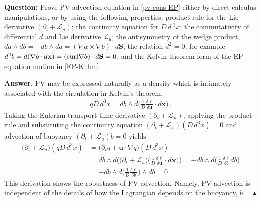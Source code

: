 \documentclass[11pt, oneside]{article}   	%
\numberwithin{equation}{section}
\theoremstyle{plain}
\theoremstyle{definition}
\theoremstyle{remark}
\newcommand{\<}{\langle}
\renewcommand{\>}{\rangle}
\newenvironment{answerwide}[1][Answer]
{\bigskip \noindent \textbf{#1.} }
{\mbox{ } \hfill{$\blacktriangle$} }
\begin{document}
\textbf{Question:}
Prove PV advection equation in \eqref{pv-cons-EP} either by direct calculus manipulations, or by using the following properties: 
product rule for the Lie derivative $(\partial_t +  \mathcal{L}_u)$; the continuity equation for $D\,d\,^3x$; the commutativity of differential $d$ 
and Lie derivative $ \mathcal{L}_u$; the antisymmetry of the wedge product, 
$da\wedge db=-db\wedge da=(\nabla a\times \nabla b)\cdot d\mathbf{S}$; the relation $d^2=0$, 
for example $d^2b = d(\nabla b \cdot d\mathbf{x})=({\rm curl} \nabla b )\cdot d\mathbf{S}=0$, and 
the Kelvin theorem form of the EP equation motion in \eqref{EP-Kthm}.
 

\begin{answerwide}
PV may be expressed naturally as a density which is intimately associated with the circulation in Kelvin's theorem, 
\begin{align*}
qD\,d^3x = db\wedge d\Big(\frac{1}{D}\frac{\delta \ell}{\delta \mathbf{u}}\cdot d\mathbf{x}\Big)
\,.\end{align*}
Taking the Eulerian transport time derivative $(\partial_t  +  \mathcal{L}_u)$, applying the product rule and 
substituting the continuity equation $(\partial_t  +  \mathcal{L}_u)(D\,d^3x)=0$ and advection of buoyancy $(\partial_t  +  \mathcal{L}_u)b=0$ yields 
\begin{align*}
\Big(\partial_t  +  \mathcal{L}_u\Big)(qD\,d^3x) &= \big(\partial_t q + \mathbf{u}\cdot\nabla q) (D\,d^3x) 
\\&= 
db\wedge d \bigg( \big(\partial_t  +  \mathcal{L}_u\big)\Big(\frac{1}{D}\frac{\delta \ell}{\delta \mathbf{u}}\cdot d\mathbf{x}\Big)\bigg)
= 
- db\wedge d \bigg( 
\frac{1}{D}\frac{\delta \ell}{\delta b} db\bigg)
\\&= 
- db\wedge d \bigg( 
\frac{1}{D}\frac{\delta \ell}{\delta b}\bigg) \wedge db
= 0
\,.\end{align*}
This derivation shows the robustness of PV advection. Namely, PV advection is independent of the details
of how the Lagrangian depends on the buoyancy, $b$. 
\end{answerwide}
\end{document}
